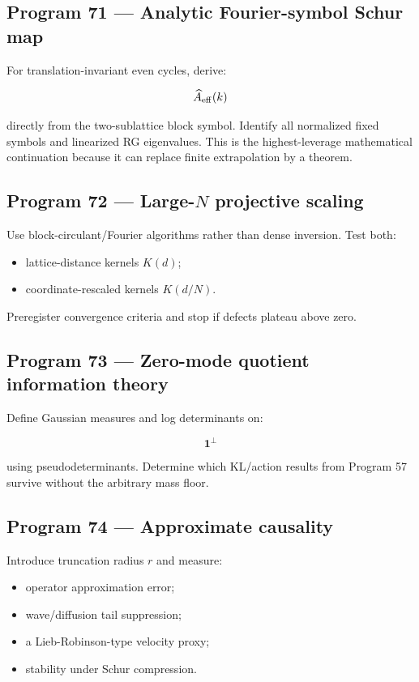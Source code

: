 \documentclass[11pt,a4paper,openany]{report}
\begin{document}
\subsection{Program 71 — Analytic Fourier-symbol Schur map}

For translation-invariant even cycles, derive:

\[
\widehat A_{\rm eff}(k)
\]

directly from the two-sublattice block symbol. Identify all normalized fixed symbols and linearized RG eigenvalues. This is the highest-leverage mathematical continuation because it can replace finite extrapolation by a theorem.

\subsection{\texorpdfstring{Program 72 — Large-\(N\) projective scaling}{Program 72 — Large-N projective scaling}}

Use block-circulant/\allowbreak{}Fourier algorithms rather than dense inversion. Test both:

\begin{itemize}
\item 
lattice-distance kernels \(K(d)\);

\item 
coordinate-rescaled kernels \(K(d/N)\).

\end{itemize}

Preregister convergence criteria and stop if defects plateau above zero.

\subsection{Program 73 — Zero-mode quotient information theory}

Define Gaussian measures and log determinants on:

\[
\mathbf1^\perp
\]

using pseudodeterminants. Determine which KL/\allowbreak{}action results from Program 57 survive without the arbitrary mass floor.

\subsection{Program 74 — Approximate causality}

Introduce truncation radius \(r\) and measure:

\begin{itemize}
\item 
operator approximation error;

\item 
wave/\allowbreak{}diffusion tail suppression;

\item 
a Lieb-Robinson-type velocity proxy;

\item 
stability under Schur compression.

\end{itemize}
\end{document}
